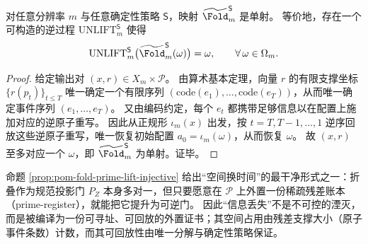 \begin{proposition}\label{prop:pom-fold-prime-lift-injective}
对任意分辨率 \(m\) 与任意确定性策略 \(\mathsf S\)，映射 \(\widetilde{\Fold}^{\mathsf S}_m\) 是单射。
等价地，存在一个可构造的逆过程 \(\mathrm{UNLIFT}^{\mathsf S}_m\) 使得
\[
\mathrm{UNLIFT}^{\mathsf S}_m\bigl(\widetilde{\Fold}^{\mathsf S}_m(\omega)\bigr)=\omega,\qquad \forall\,\omega\in\Omega_m.
\]
\end{proposition}
\begin{proof}
给定输出对 \((x,r)\in X_m\times\mathcal P\)。
由算术基本定理，向量 \(r\) 的有限支撑坐标 \(\{r(p_t)\}_{t\le T}\) 唯一确定一个有限序列 \((\mathrm{code}(e_1),\dots,\mathrm{code}(e_T))\)，从而唯一确定事件序列 \((e_1,\dots,e_T)\)。
又由编码约定，每个 \(e_t\) 都携带足够信息以在配置上施加对应的逆原子重写。
因此从正规形 \(\iota_m(x)\) 出发，按 \(t=T,T{-}1,\dots,1\) 逆序回放这些逆原子重写，唯一恢复初始配置 \(a_0=\iota_m(\omega)\)，从而恢复 \(\omega\)。
故 \((x,r)\) 至多对应一个 \(\omega\)，即 \(\widetilde{\Fold}^{\mathsf S}_m\) 为单射。证毕。
\end{proof}\begin{remark}\label{rem:pom-fold-lossless}
命题 \ref{prop:pom-fold-prime-lift-injective} 给出“空间换时间”的最干净形式之一：折叠作为规范投影门 \(P_Z\) 本身多对一，但只要愿意在 \(\mathcal P\) 上外置一份稀疏残差账本（prime-register），就能把它提升为可逆门。
因此“信息丢失”不是不可控的湮灭，而是被编译为一份可寻址、可回放的外置证书；其空间占用由残差支撑大小（原子事件条数）计数，而其可回放性由唯一分解与确定性策略保证。
\end{remark}



